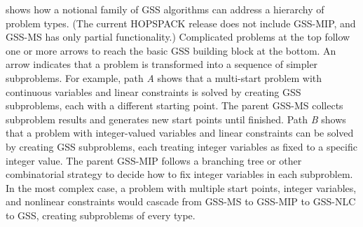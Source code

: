  shows how a notional family of GSS algorithms can address
a hierarchy of problem types.  (The current HOPSPACK release does not include
GSS-MIP, and GSS-MS has only partial functionality.)
Complicated problems at the top follow one or more
arrows to reach the basic GSS building block at the bottom.  An arrow indicates
that a problem is transformed into a sequence of simpler subproblems.
For example, path {\it A} shows that a multi-start problem with continuous
variables and linear constraints is solved by creating GSS subproblems, each
with a different starting point.  The parent GSS-MS collects subproblem results
and generates new start points until finished.
Path {\it B} shows that a problem with integer-valued variables and linear
constraints can be solved by creating GSS subproblems, each treating integer
variables as fixed to a specific integer value.  The parent GSS-MIP follows
a branching tree or other combinatorial strategy to decide how to fix
integer variables in each subproblem.
In the most complex case, a problem with multiple start points,
integer variables, and nonlinear constraints would cascade from GSS-MS
to GSS-MIP to GSS-NLC to GSS, creating subproblems of every type.

